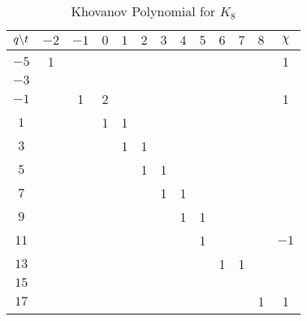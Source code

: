 \documentclass{article}
\theoremstyle{plain}
\begin{document}
        \begin{table}[H]
            \centering
            \begin{tabular}{| c | c | c | c | c | c | c | c | c | c | c | c | c |}
                \hline
                $q\symbol{92}t$&$-2$&$-1$&$0$&$1$&$2$&$3$&$4$&$5$&$6$&$7$&$8$&$\chi$\\
                \hline
                $-5$&1&&&&&&&&&&&1\\
                \hline
                $-3$&&&&&&&&&&&&\\
                \hline
                $-1$&&1&2&&&&&&&&&1\\
                \hline
                $1$&&&1&1&&&&&&&&\\
                \hline
                $3$&&&&1&1&&&&&&&\\
                \hline
                $5$&&&&&1&1&&&&&&\\
                \hline
                $7$&&&&&&1&1&&&&&\\
                \hline
                $9$&&&&&&&1&1&&&&\\
                \hline
                $11$&&&&&&&&1&&&&$-1$\\
                \hline
                $13$&&&&&&&&&1&1&&\\
                \hline
                $15$&&&&&&&&&&&&\\
                \hline
                $17$&&&&&&&&&&&1&1\\
                \hline
            \end{tabular}
            \caption{Khovanov Polynomial for $K_{8}$}
            \label{table:m_8_kho}
        \end{table}
\end{document}
